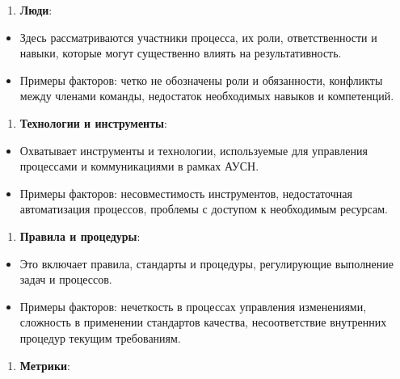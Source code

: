 \begin{enumerate}
\def\labelenumi{\arabic{enumi}.}
\setcounter{enumi}{1}
\item
  {\bfseries Люди}:
\end{enumerate}

\begin{itemize}
\item
  Здесь рассматриваются участники процесса, их роли, ответственности и
  навыки, которые могут существенно влиять на результативность.
\item
  Примеры факторов: четко не обозначены роли и обязанности, конфликты
  между членами команды, недостаток необходимых навыков и компетенций.
\end{itemize}

\begin{enumerate}
\def\labelenumi{\arabic{enumi}.}
\setcounter{enumi}{2}
\item
  {\bfseries Технологии и инструменты}:
\end{enumerate}

\begin{itemize}
\item
  Охватывает инструменты и технологии, используемые для управления
  процессами и коммуникациями в рамках АУСН.
\item
  Примеры факторов: несовместимость инструментов, недостаточная
  автоматизация процессов, проблемы с доступом к необходимым ресурсам.
\end{itemize}

\begin{enumerate}
\def\labelenumi{\arabic{enumi}.}
\setcounter{enumi}{3}
\item
  {\bfseries Правила и процедуры}:
\end{enumerate}

\begin{itemize}
\item
  Это включает правила, стандарты и процедуры, регулирующие выполнение
  задач и процессов.
\item
  Примеры факторов: нечеткость в процессах управления изменениями,
  сложность в применении стандартов качества, несоответствие внутренних
  процедур текущим требованиям.
\end{itemize}

\begin{enumerate}
\def\labelenumi{\arabic{enumi}.}
\setcounter{enumi}{4}
\item
  {\bfseries Метрики}:
\end{enumerate}

